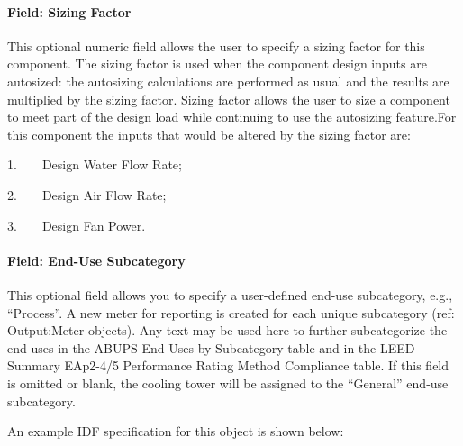 \paragraph{Field: Sizing Factor}\label{field-sizing-factor-2}

This optional numeric field allows the user to specify a sizing factor for this component. The sizing factor is used when the component design inputs are autosized: the autosizing calculations are performed as usual and the results are multiplied by the sizing factor. Sizing factor allows the user to size a component to meet part of the design load while continuing to use the autosizing feature.For this component the inputs that would be altered by the sizing factor are:

1.~~~~Design Water Flow Rate;

2.~~~~Design Air Flow Rate;

3.~~~~Design Fan Power.

\paragraph{Field: End-Use Subcategory}\label{end-use-subcategory-05}

This optional field allows you to specify a user-defined end-use subcategory, e.g., ``Process''. A new meter for reporting is created for each unique subcategory (ref: Output:Meter objects). Any text may be used here to further subcategorize the end-uses in the ABUPS End Uses by Subcategory table and in the LEED Summary EAp2-4/5 Performance Rating Method Compliance table. If this field is omitted or blank, the cooling tower will be assigned to the ``General'' end-use subcategory.

An example IDF specification for this object is shown below:

